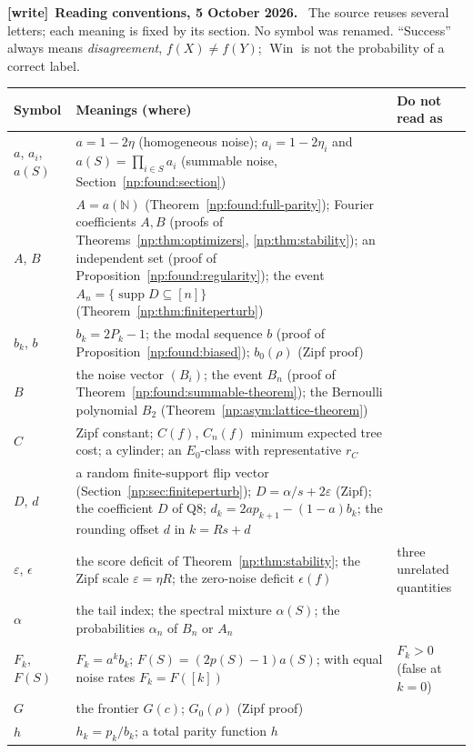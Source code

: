 \documentclass[11pt,a4paper]{article}
\theoremstyle{definition}
\theoremstyle{remark}
\newcommand{\N}{\mathbb N}
\newcommand{\Win}{\operatorname{Win}}
\newcommand{\supp}{\operatorname{supp}}
\newenvironment{writenote}[1][]{\par\smallskip\begingroup\small
 \noindent\textbf{[write]}\if\relax\detokenize{#1}\relax\else~\textbf{#1.}\fi\ }%
 {\par\endgroup\smallskip}
\begin{document}
\begin{writenote}[Reading conventions, 5 October 2026]
The source reuses several letters; each meaning is fixed by its section.
No symbol was renamed. ``Success'' always means \emph{disagreement},
$f(X)\ne f(Y)$; $\Win$ is not the probability of a correct label.
\end{writenote}
{\small
\begin{longtable}{@{}L{.13\textwidth}L{.50\textwidth}L{.28\textwidth}@{}}
\toprule
Symbol & Meanings (where) & Do not read as\\
\midrule
\endhead
$a$, $a_i$, $a(S)$ & $a=1-2\eta$ (homogeneous noise); $a_i=1-2\eta_i$ and
 $a(S)=\prod_{i\in S}a_i$ (summable noise, Section~\ref{np:found:section}) &
 \\
$A$, $B$ & $A=a(\N)$ (Theorem~\ref{np:found:full-parity}); Fourier
 coefficients $A,B$ (proofs of Theorems~\ref{np:thm:optimizers},
 \ref{np:thm:stability}); an independent set (proof of
 Proposition~\ref{np:found:regularity}); the event
 $A_n=\{\supp D\subseteq[n]\}$ (Theorem~\ref{np:thm:finiteperturb}) &
 \\
$b_k$, $b$ & $b_k=2P_k-1$; the modal sequence $b$ (proof of
 Proposition~\ref{np:found:biased}); $b_0(\rho)$ (Zipf proof) &
 \\
$B$ & the noise vector $(B_i)$; the event $B_n$ (proof of
 Theorem~\ref{np:found:summable-theorem}); the Bernoulli polynomial $B_2$
 (Theorem~\ref{np:asym:lattice-theorem}) &
 \\
$C$ & Zipf constant; $C(f)$, $C_n(f)$ minimum expected tree cost; a
 cylinder; an $E_0$-class with representative $r_C$ & \\
$D$, $d$ & a random finite-support flip vector
 (Section~\ref{np:sec:finiteperturb}); $D=\alpha/s+2\varepsilon$ (Zipf);
 the coefficient $D$ of Q8; $d_k=2ap_{k+1}-(1-a)b_k$; the rounding offset
 $d$ in $k=Rs+d$ & \\
$\varepsilon$, $\epsilon$ & the score deficit of
 Theorem~\ref{np:thm:stability}; the Zipf scale $\varepsilon=\eta R$; the
 zero-noise deficit $\epsilon(f)$ & three unrelated quantities\\
$\alpha$ & the tail index; the spectral mixture $\alpha(S)$; the
 probabilities $\alpha_n$ of $B_n$ or $A_n$ & \\
$F_k$, $F(S)$ & $F_k=a^kb_k$; $F(S)=(2p(S)-1)a(S)$; with equal noise
 rates $F_k=F([k])$ & $F_k>0$ (false at $k=0$)\\
$G$ & the frontier $G(c)$; $G_0(\rho)$ (Zipf proof) & \\
$h$ & $h_k=p_k/b_k$; a total parity function $h$

\end{longtable}}
\end{document}
